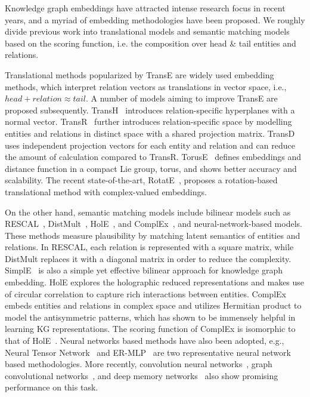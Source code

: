 \documentclass{article}
\begin{document}
Knowledge graph embeddings have attracted intense research focus in recent years, and a myriad of embedding methodologies have been proposed. We roughly divide previous work into translational models and semantic matching models based on the scoring function, i.e. the composition over head \& tail entities and relations.

Translational methods popularized by TransE \citep{bordes2013translating} are widely used embedding methods, which interpret relation vectors as translations in vector space, i.e., $head + \textit{relation} \approx tail$. A number of models aiming to improve TransE are proposed subsequently. TransH~\citep{wang2014knowledge} introduces relation-specific hyperplanes with a normal vector. TransR~\citep{lin2015learning} further introduces relation-specific space by modelling entities and relations in distinct space with a shared projection matrix. TransD~\citep{ji2015knowledge} uses independent projection vectors for each entity and relation and can reduce the amount of calculation compared to TransR. TorusE~\citep{ebisu2018toruse} defines embeddings and distance function in a compact Lie group, torus, and shows better accuracy and scalability. The recent state-of-the-art, RotatE~\citep{sun2019rotate}, proposes a rotation-based translational method with complex-valued embeddings.

On the other hand, semantic matching models include bilinear models such as RESCAL~\citep{nickel2011three}, DistMult~\citep{yang2014embedding}, HolE~\citep{nickel2016holographic}, and ComplEx~\citep{trouillon2016complex}, and neural-network-based models. These methods measure plausibility by matching latent semantics of entities and relations. In RESCAL, each relation is represented with a square matrix, while DistMult replaces it with a diagonal matrix in order to reduce the complexity. SimplE~\citep{kazemi2018simple} is also a simple yet effective bilinear approach for knowledge graph embedding. HolE explores the holographic reduced representations and makes use of circular correlation to capture rich interactions between entities. ComplEx embeds entities and relations in complex space and utilizes Hermitian product to model the antisymmetric patterns, which has shown to be immensely helpful in learning KG representations. The scoring function of ComplEx is isomorphic to that of HolE~\citep{trouillon2017complex}. Neural networks based methods have also been adopted, e.g., Neural Tensor Network~\citep{socher2013reasoning} and ER-MLP~\citep{dong2014knowledge} are two representative neural network based methodologies. More recently, convolution neural networks~\citep{dettmers2018convolutional}, graph convolutional networks~\citep{schlichtkrull2018modeling}, and deep memory networks~\citep{wang2018knowledge} also show promising performance on this task.
\end{document}
